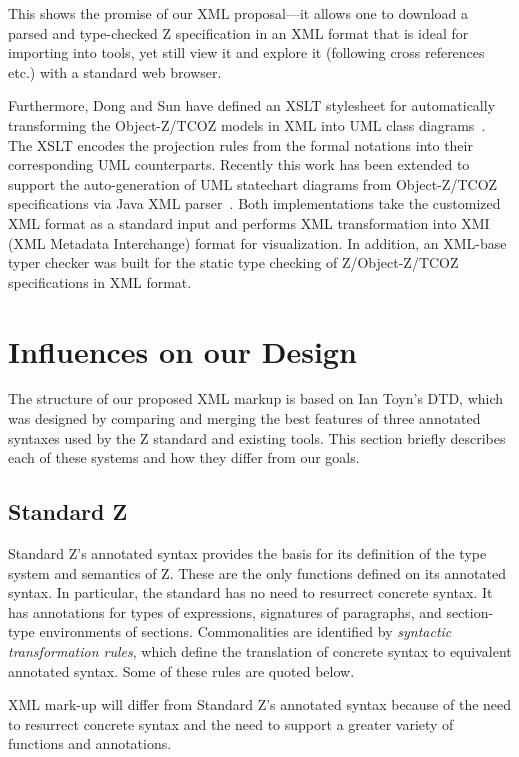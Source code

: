 \documentclass{llncs}  %
\begin{document}
This shows the promise of our XML proposal---it allows one to download a parsed
and type-checked Z specification in an XML format that is ideal for
importing into tools, yet still view it and explore it (following
cross references etc.) with a standard web browser.

Furthermore, Dong and Sun have defined an XSLT stylesheet for
automatically transforming the Object-Z/TCOZ models in XML into UML
class diagrams~\cite{sun01www}. The XSLT encodes the projection rules
from the formal notations into their corresponding UML
counterparts. Recently this work has been extended to support the
auto-generation of UML statechart diagrams from Object-Z/TCOZ
specifications via Java XML parser~\cite{dong02icfem}. Both
implementations take the customized XML format as a standard input and
performs XML transformation into XMI (XML Metadata Interchange) format
for visualization. In addition, an XML-base typer checker was built
for the static type checking of Z/Object-Z/TCOZ specifications in XML
format.


\section{Influences on our Design}

The structure of our proposed XML markup is based on Ian Toyn's DTD,
which was designed by comparing and merging the best features
of three annotated syntaxes used by the Z standard and existing tools.
This section briefly describes each of these systems and how they
differ from our goals.

\subsection{Standard Z}

Standard Z's annotated syntax provides the basis for its definition
of the type system and semantics of Z.
These are the only functions defined on its annotated syntax.
In particular, the standard has no need to resurrect concrete syntax.
It has annotations for types of expressions,
signatures of paragraphs, and section-type environments of sections.
Commonalities are identified by \textit{syntactic transformation rules},
which define the translation of concrete syntax to equivalent annotated syntax.
Some of these rules are quoted below.

XML mark-up will differ from Standard Z's annotated syntax
because of the need to resurrect concrete syntax
and the need to support a greater variety of functions and annotations.
\end{document}
